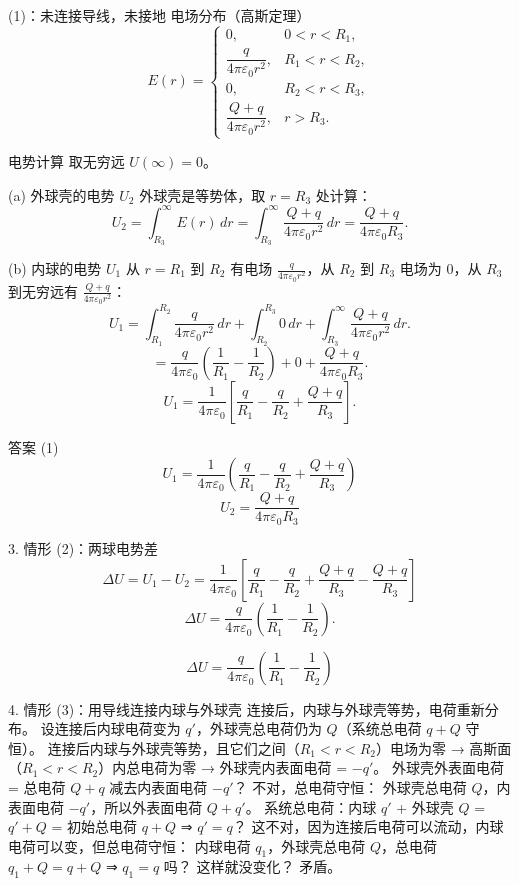 \documentclass{article}
\begin{document}
 (1)：未连接导线，未接地
 电场分布（高斯定理）
$$
E(r) =
\begin{cases}
0, & 0 < r < R_1, \\
\dfrac{q}{4\pi\varepsilon_0 r^2}, & R_1 < r < R_2, \\
0, & R_2 < r < R_3, \\
\dfrac{Q+q}{4\pi\varepsilon_0 r^2}, & r > R_3.
\end{cases}
$$



 电势计算
取无穷远 $ U(\infty) = 0 $。

(a) 外球壳的电势 $ U_2 $
外球壳是等势体，取 $ r = R_3 $ 处计算：
$$
U_2 = \int_{R_3}^{\infty} E(r) \, dr
= \int_{R_3}^{\infty} \frac{Q+q}{4\pi\varepsilon_0 r^2} \, dr
= \frac{Q+q}{4\pi\varepsilon_0 R_3}.
$$

(b) 内球的电势 $ U_1 $
从 $ r = R_1 $ 到 $ R_2 $ 有电场 $ \frac{q}{4\pi\varepsilon_0 r^2} $，从 $ R_2 $ 到 $ R_3 $ 电场为 0，从 $ R_3 $ 到无穷远有 $ \frac{Q+q}{4\pi\varepsilon_0 r^2} $：
$$
U_1 = \int_{R_1}^{R_2} \frac{q}{4\pi\varepsilon_0 r^2} \, dr
+ \int_{R_2}^{R_3} 0 \, dr
+ \int_{R_3}^{\infty} \frac{Q+q}{4\pi\varepsilon_0 r^2} \, dr.
$$
$$
= \frac{q}{4\pi\varepsilon_0} \left( \frac{1}{R_1} - \frac{1}{R_2} \right) + 0 + \frac{Q+q}{4\pi\varepsilon_0 R_3}.
$$
$$
U_1 = \frac{1}{4\pi\varepsilon_0} \left[ \frac{q}{R_1} - \frac{q}{R_2} + \frac{Q+q}{R_3} \right].
$$



 答案 (1)
$$
\boxed{U_1 = \frac{1}{4\pi\varepsilon_0} \left( \frac{q}{R_1} - \frac{q}{R_2} + \frac{Q+q}{R_3} \right)}
$$
$$
\boxed{U_2 = \frac{Q+q}{4\pi\varepsilon_0 R_3}}
$$



 3. 情形 (2)：两球电势差
$$
\Delta U = U_1 - U_2
= \frac{1}{4\pi\varepsilon_0} \left[ \frac{q}{R_1} - \frac{q}{R_2} + \frac{Q+q}{R_3} - \frac{Q+q}{R_3} \right]
$$
$$
\Delta U = \frac{q}{4\pi\varepsilon_0} \left( \frac{1}{R_1} - \frac{1}{R_2} \right).
$$

$$
\boxed{\Delta U = \frac{q}{4\pi\varepsilon_0} \left( \frac{1}{R_1} - \frac{1}{R_2} \right)}
$$



 4. 情形 (3)：用导线连接内球与外球壳
连接后，内球与外球壳等势，电荷重新分布。  
设连接后内球电荷变为 $ q' $，外球壳总电荷仍为 $ Q $（系统总电荷 $ q+Q $ 守恒）。  
连接后内球与外球壳等势，且它们之间（$ R_1 < r < R_2 $）电场为零 → 高斯面（$ R_1 < r < R_2 $）内总电荷为零 → 外球壳内表面电荷 = $ -q' $。  
外球壳外表面电荷 = 总电荷 $ Q+q $ 减去内表面电荷 $ -q' $？ 不对，总电荷守恒：  
外球壳总电荷 $ Q $，内表面电荷 $ -q' $，所以外表面电荷 $ Q + q' $。  
系统总电荷：内球 $ q' $ + 外球壳 $ Q $ = $ q' + Q $ = 初始总电荷 $ q+Q $ ⇒ $ q' = q $？ 这不对，因为连接后电荷可以流动，内球电荷可以变，但总电荷守恒：  
内球电荷 $ q_1 $，外球壳总电荷 $ Q $，总电荷 $ q_1 + Q = q + Q $ ⇒ $ q_1 = q $ 吗？ 这样就没变化？ 矛盾。
\end{document}
